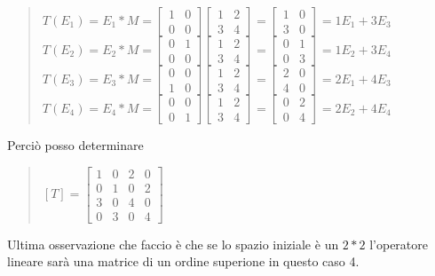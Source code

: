 \documentclass[a4paper]{article}
\begin{document}
\begin{quote} \centering $T(E_{1})= E_{1} *M= \left[\begin{matrix}1& 0\\ 0 & 0\end{matrix}\right]\left[\begin{matrix}1& 2 \\ 3 & 4\end{matrix}\right]= \left[\begin{matrix}1& 0 \\ 3 & 0\end{matrix}\right]= 1E_{1}+3E_{3}
$
\bigskip \\ $T(E_{2})= E_{2} *M= \left[\begin{matrix}0& 1\\ 0 & 0\end{matrix}\right]\left[\begin{matrix}1& 2 \\ 3 & 4\end{matrix}\right]= \left[\begin{matrix}0& 1 \\ 0 & 3\end{matrix}\right]= 1E_{2}+3E_{4}
$
\bigskip \\ $T(E_{3})= E_{3} *M= \left[\begin{matrix}0& 0\\ 1 & 0\end{matrix}\right]\left[\begin{matrix}1& 2 \\ 3 & 4\end{matrix}\right]= \left[\begin{matrix}2& 0 \\ 4 & 0\end{matrix}\right]= 2E_{1}+4E_{3}
$
\bigskip \\ $T(E_{4})= E_{4} *M= \left[\begin{matrix}0& 0\\ 0 & 1\end{matrix}\right]\left[\begin{matrix}1& 2 \\ 3 & 4\end{matrix}\right]= \left[\begin{matrix}0& 2\\ 0 & 4\end{matrix}\right]= 2E_{2}+4E_{4}
$\end{quote}
Perciò posso determinare 
\begin{quote} \centering $[T]=\left[\begin{matrix}1& 0&2&0\\ 0 & 1& 0 & 2\\3&0&4&0\\0&3&0&4\end{matrix}\right]
$ \end{quote}
Ultima osservazione che faccio è che se lo spazio iniziale è un $2*2$ l'operatore lineare sarà una matrice di un ordine superione in questo caso 4.
\end{document}
